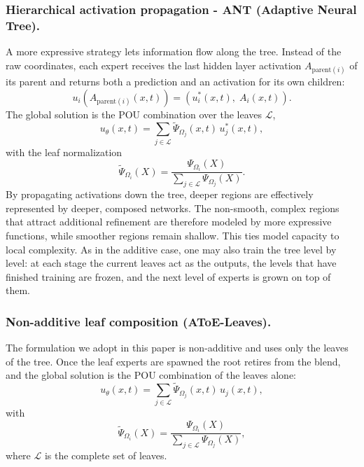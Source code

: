 \subsubsection{Hierarchical activation propagation - ANT (Adaptive Neural Tree).}
A more expressive strategy lets information flow along the tree. Instead of the
raw coordinates, each expert receives the last hidden layer activation
$A_{\mathrm{parent}(i)}$ of its parent and returns both a prediction and an
activation for its own children:
\begin{equation}
u_i\!\left(A_{\mathrm{parent}(i)}(x,t)\right)
= \left( u_i^{*}(x,t),\; A_i(x,t) \right).
\label{eq:ant_activation}
\end{equation}
The global solution is the POU combination over the leaves
$\mathcal{L}$,
\begin{equation}
u_\theta(x,t) = \sum_{j \in \mathcal{L}}
\tilde{\Psi}_{\Omega_j}(x,t)\, u_j^{*}(x,t),
\label{eq:global_ant}
\end{equation}
with the leaf normalization
\begin{equation}
\tilde{\Psi}_{\Omega_i}(X) = \frac{\Psi_{\Omega_i}(X)}{\sum_{j \in \mathcal{L}} \Psi_{\Omega_j}(X)}.
\label{eq:normalization_ant}
\end{equation}
By propagating activations down the tree, deeper regions are effectively
represented by deeper, composed networks. The non-smooth, complex regions that
attract additional refinement are therefore modeled by more expressive functions,
while smoother regions remain shallow. This ties model capacity to local
complexity. As in the additive case, one may also train the tree level by level:
at each stage the current leaves act as the outputs, the levels that have finished
training are frozen, and the next level of experts is grown on top of them.

\subsubsection{Non-additive leaf composition (AToE-Leaves).}
The formulation we adopt in this paper is non-additive and uses only the leaves of
the tree. Once the leaf experts are spawned the root retires from the blend, and
the global solution is the POU combination of the leaves alone:
\begin{equation}
u_\theta(x,t) =
\sum_{j \in \mathcal{L}}
\tilde{\Psi}_{\Omega_j}(x,t)\, u_j(x,t),
\label{eq:global_atoe_leaves}
\end{equation}
with
\begin{equation}
\tilde{\Psi}_{\Omega_i}(X) = \frac{\Psi_{\Omega_i}(X)}{\sum_{j \in \mathcal{L}} \Psi_{\Omega_j}(X)},
\label{eq:normalization_leaves}
\end{equation}
where $\mathcal{L}$ is the complete set of leaves.


